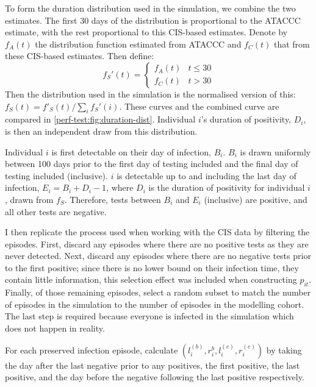 \documentclass[thesis.tex]{subfiles}
\begin{document}
To form the duration distribution used in the simulation, we combine the two estimates.
The first 30 days of the distribution is proportional to the ATACCC estimate, with the rest proportional to this CIS-based estimates.
Denote by $f_A(t)$ the distribution function estimated from ATACCC and $f_C(t)$ that from these CIS-based estimates.
Then define:
$$
f_S'(t) = \begin{cases}
	f_A(t) &t \leq 30 \\
	f_C(t) &t > 30
\end{cases}
$$
Then the distribution used in the simulation is the normalised version of this: $f_S(t) = f'_S(t)/\sum_i f_S'(i)$.
These curves and the combined curve are compared in \cref{perf-test:fig:duration-dist}.
Individual $i$'s duration of positivity, $D_i$, is then an independent draw from this distribution.

Individual $i$ is first detectable on their day of infection, $B_i$.
$B_i$ is drawn uniformly between 100 days prior to the first day of testing included and the final day of testing included (inclusive).
$i$ is detectable up to and including the last day of infection, $E_i = B_i + D_i - 1$, where $D_i$ is the duration of positivity for individual $i$, drawn from $f_S$.
Therefore, tests between $B_i$ and $E_i$ (inclusive) are positive, and all other tests are negative.

I then replicate the process used when working with the CIS data by filtering the episodes.
First, discard any episodes where there are no positive tests as they are never detected.
Next, discard any episodes where there are no negative tests prior to the first positive; since there is no lower bound on their infection time, they contain little information, this selection effect was included when constructing $p_{it}$.
Finally, of those remaining episodes, select a random subset to match the number of episodes in the simulation to the number of episodes in the modelling cohort.
The last step is required because everyone is infected in the simulation which does not happen in reality.

For each preserved infection episode, calculate $(l_i^{(b)}, r_i^{b}, l_i^{(e)}, r_i^{(e)})$ by taking the day after the last negative prior to any positives, the first positive, the last positive, and the day before the negative following the last positive respectively.
\end{document}
